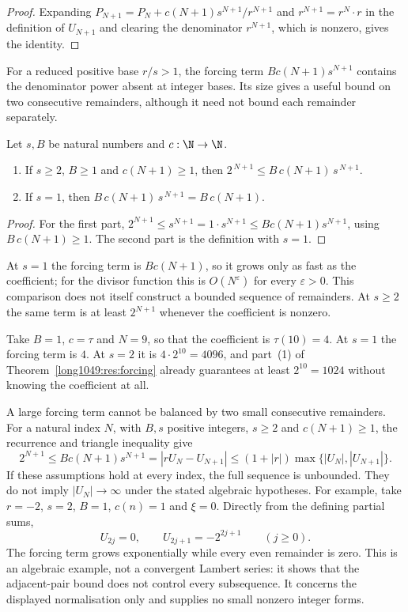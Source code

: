 \begin{proof}
Expanding
$P_{N+1}=P_N+c(N+1)s^{N+1}/r^{N+1}$ and $r^{N+1}=r^{N}\cdot r$ in the
definition of $U_{N+1}$ and clearing the denominator $r^{N+1}$, which is
nonzero, gives the identity.
\end{proof}

For a reduced positive base $r/s>1$, the forcing term
$Bc(N+1)s^{N+1}$ contains the denominator power absent at integer
bases. Its size gives a useful bound on two consecutive remainders,
although it need not bound each remainder separately.

\begin{theorem}\label{long1049:res:forcing}
Let $s,B$ be natural numbers and $c:\N\to\N$.
\begin{enumerate}
\item If $s\ge2$, $B\ge1$ and $c(N+1)\ge1$, then
$2^{\,N+1}\le B\,c(N+1)\,s^{\,N+1}$.
\item If $s=1$, then $B\,c(N+1)\,s^{\,N+1}=B\,c(N+1)$.
\end{enumerate}
\end{theorem}

\begin{proof}
For the first part,
$2^{N+1}\le s^{N+1}=1\cdot s^{N+1}\le Bc(N+1)s^{N+1}$,
using $B\,c(N+1)\ge1$.  The second part is the definition with $s=1$.
\end{proof}

At $s=1$ the forcing term is $Bc(N+1)$, so it grows only as fast as the
coefficient; for the divisor function this is $O(N^{\varepsilon})$ for every
$\varepsilon>0$. This comparison does not itself construct a bounded
sequence of remainders.  At $s\ge2$ the same
term is at least $2^{N+1}$ whenever the coefficient is nonzero.

\begin{example}\label{long1049:ex:forcing}
Take $B=1$, $c=\tau$ and $N=9$, so that the coefficient is $\tau(10)=4$.  At
$s=1$ the forcing term is $4$.  At $s=2$ it is $4\cdot2^{10}=4096$, and part~(1)
of Theorem~\ref{long1049:res:forcing} already guarantees at least $2^{10}=1024$ without
knowing the coefficient at all.
\end{example}

A large forcing term cannot be balanced by two small consecutive
remainders. For a natural index $N$, with $B,s$ positive integers,
$s\ge2$ and $c(N+1)\ge1$, the recurrence and triangle inequality give
\[
 2^{N+1}\le Bc(N+1)s^{N+1}
 =|rU_N-U_{N+1}|
 \le(1+|r|)\max\{|U_N|,|U_{N+1}|\}.
\]
If these assumptions hold at every index, the full sequence is unbounded.
They do not imply $|U_N|\to\infty$ under the stated algebraic hypotheses. For example, take $r=-2$, $s=2$,
$B=1$, $c(n)=1$ and $\xi=0$. Directly from the defining partial sums,
\[
 U_{2j}=0,\qquad U_{2j+1}=-2^{2j+1}\qquad(j\ge0).
\]
The forcing term grows exponentially while every even remainder is
zero. This is an algebraic example, not a convergent Lambert series: it
shows that the adjacent-pair bound does not control every subsequence.
It concerns the displayed normalisation only and supplies no small
nonzero integer forms.

